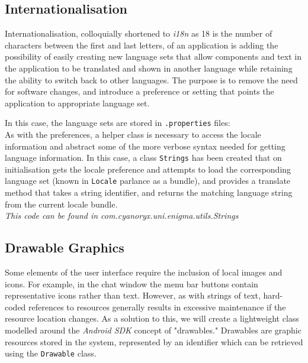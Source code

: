   \subsection{Internationalisation}
  
  Internationalisation, colloquially shortened to \emph{i18n} as 18 is the number of characters between the first and last letters, of an application is adding the possibility of easily creating new language sets that allow components and text in the application to be translated and shown in another language while retaining the ability to switch back to other languages. The purpose is to remove the need for software changes, and introduce a preference or setting that points the application to appropriate language set.
  
  In this case, the language sets are stored in \verb!.properties! files: \\
  
  
  
  As with the preferences, a helper class is necessary to access the locale information and abstract some of the more verbose syntax needed for getting language information. In this case, a class \verb!Strings! has been created that on initialisation gets the locale preference and attempts to load the corresponding language set (known in \verb!Locale! parlance as a bundle), and provides a translate method that takes a string identifier, and returns the matching language string from the current locale bundle. \\
  
  
  
  \emph{This code can be found in com.cyanoryx.uni.enigma.utils.Strings}
  
  \subsection{Drawable Graphics}
  
  Some elements of the user interface require the inclusion of local images and icons. For example, in the chat window the menu bar buttons contain representative icons rather than text. However, as with strings of text, hard-coded references to resources generally results in excessive maintenance if the resource location changes. As a solution to this, we will create a lightweight class modelled around the \emph{Android SDK} concept of "drawables." Drawables are graphic resources stored in the system, represented by an identifier which can be retrieved using the \verb!Drawable! class.\\
  
